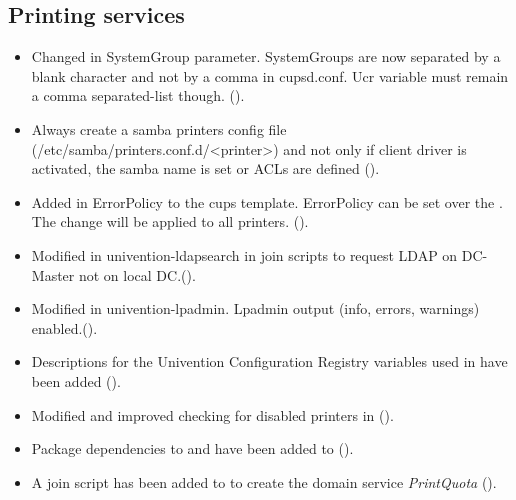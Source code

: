 \subsection{Printing services}
\begin{itemize}
\item Changed in  SystemGroup parameter. SystemGroups are now separated by a blank character and not by a comma in cupsd.conf. Ucr variable must remain a comma separated-list though. ().

\item Always create a samba printers config file
(/etc/samba/printers.conf.d/<printer>) and not only if client driver is
activated, the samba name is set or ACLs are defined ().

\item Added in  ErrorPolicy to the cups template. ErrorPolicy can be set over the . The change will be applied to all printers. ().

\item Modified in  univention-ldapsearch in join scripts to request LDAP on DC-Master not on local DC.().

\item Modified in  univention-lpadmin. Lpadmin output (info, errors, warnings) enabled.().

\item Descriptions for the Univention Configuration Registry variables used in  have been added ().

\item Modified and improved checking for disabled printers in   ().

\item Package dependencies to  and  have been added to  ().

\item A join script has been added to  to
create the domain service \emph{PrintQuota} ().

\end{itemize}


